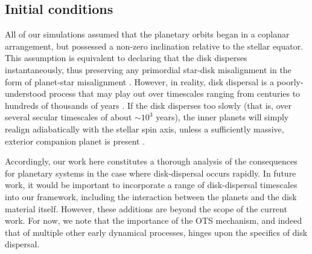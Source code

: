 \documentclass[twocolumn]{aastex63}
\begin{document}



\subsection{Initial conditions}

All of our simulations assumed that the planetary orbits began in a coplanar arrangement, but possessed a non-zero inclination relative to the stellar equator. This assumption is equivalent to declaring that the disk disperses instantaneously, thus preserving any primordial star-disk misalignment in the form of planet-star misalignment \citep{spalding2016spin}. However, in reality, disk dispersal is a poorly-understood process that may play out over timescales ranging from centuries to hundreds of thousands of years \citep{alexander2014dispersal}. If the disk disperses too slowly (that is, over several secular timescales of about $\sim10^3$ years), the inner planets will simply realign adiabatically with the stellar spin axis, unless a sufficiently massive, exterior companion planet is present \citep{spalding2020stellar}. 

Accordingly, our work here constitutes a thorough analysis of the consequences for planetary systems in the case where disk-dispersal occurs rapidly. In future work, it would be important to incorporate a range of disk-dispersal timescales into our framework, including the interaction between the planets and the disk material itself. However, these additions are beyond the scope of the current work. For now, we note that the importance of the OTS mechanism, and indeed that of multiple other early dynamical processes, hinges upon the specifics of disk dispersal. 
\end{document}
